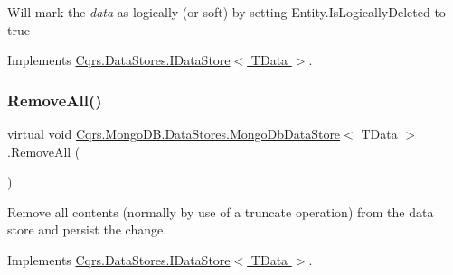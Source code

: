 Will mark the {\itshape data}  as logically (or soft) by setting Entity.\+Is\+Logically\+Deleted to true 



Implements \hyperlink{interfaceCqrs_1_1DataStores_1_1IDataStore_a7ef540796bbe4257296841590bc23478_a7ef540796bbe4257296841590bc23478}{Cqrs.\+Data\+Stores.\+I\+Data\+Store$<$ T\+Data $>$}.

\mbox{\label{classCqrs_1_1MongoDB_1_1DataStores_1_1MongoDbDataStore_ac0cb8626e8f8ab0275a31e88a920ee3e_ac0cb8626e8f8ab0275a31e88a920ee3e}} 
\subsubsection{\texorpdfstring{Remove\+All()}{RemoveAll()}}
{\footnotesize\ttfamily virtual void \hyperlink{classCqrs_1_1MongoDB_1_1DataStores_1_1MongoDbDataStore}{Cqrs.\+Mongo\+D\+B.\+Data\+Stores.\+Mongo\+Db\+Data\+Store}$<$ T\+Data $>$.Remove\+All (\begin{DoxyParamCaption}{ }\end{DoxyParamCaption})\hspace{0.3cm}{\ttfamily [virtual]}}



Remove all contents (normally by use of a truncate operation) from the data store and persist the change. 



Implements \hyperlink{interfaceCqrs_1_1DataStores_1_1IDataStore_aead8d7a39a717d29af05daf7b64bea94_aead8d7a39a717d29af05daf7b64bea94}{Cqrs.\+Data\+Stores.\+I\+Data\+Store$<$ T\+Data $>$}.

\mbox{\label{classCqrs_1_1MongoDB_1_1DataStores_1_1MongoDbDataStore_a2fef1856a801d2f247ed5b0a0f3bea9a_a2fef1856a801d2f247ed5b0a0f3bea9a}} 
